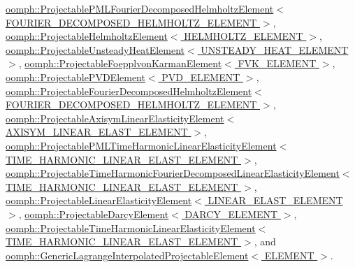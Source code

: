 \hyperlink{classoomph_1_1ProjectablePMLFourierDecomposedHelmholtzElement_a80ea03cabadebba315958b75987ab4ed}{oomph\+::\+Projectable\+P\+M\+L\+Fourier\+Decomposed\+Helmholtz\+Element$<$ F\+O\+U\+R\+I\+E\+R\+\_\+\+D\+E\+C\+O\+M\+P\+O\+S\+E\+D\+\_\+\+H\+E\+L\+M\+H\+O\+L\+T\+Z\+\_\+\+E\+L\+E\+M\+E\+N\+T $>$}, \hyperlink{classoomph_1_1ProjectableHelmholtzElement_a4ec9aaa5311ce1724014c4c4240a4d59}{oomph\+::\+Projectable\+Helmholtz\+Element$<$ H\+E\+L\+M\+H\+O\+L\+T\+Z\+\_\+\+E\+L\+E\+M\+E\+N\+T $>$}, \hyperlink{classoomph_1_1ProjectableUnsteadyHeatElement_a1fcd0a7808f65c0ffde81c1e23d0e1c1}{oomph\+::\+Projectable\+Unsteady\+Heat\+Element$<$ U\+N\+S\+T\+E\+A\+D\+Y\+\_\+\+H\+E\+A\+T\+\_\+\+E\+L\+E\+M\+E\+N\+T $>$}, \hyperlink{classoomph_1_1ProjectableFoepplvonKarmanElement_a7b6ce72f267669ecd5fc0119f669772f}{oomph\+::\+Projectable\+Foepplvon\+Karman\+Element$<$ F\+V\+K\+\_\+\+E\+L\+E\+M\+E\+N\+T $>$}, \hyperlink{classoomph_1_1ProjectablePVDElement_a82923f600601aa9f0c9e1b168f0d8fa5}{oomph\+::\+Projectable\+P\+V\+D\+Element$<$ P\+V\+D\+\_\+\+E\+L\+E\+M\+E\+N\+T $>$}, \hyperlink{classoomph_1_1ProjectableFourierDecomposedHelmholtzElement_ab1f9e43fe32a5c09fefe61f324a650cc}{oomph\+::\+Projectable\+Fourier\+Decomposed\+Helmholtz\+Element$<$ F\+O\+U\+R\+I\+E\+R\+\_\+\+D\+E\+C\+O\+M\+P\+O\+S\+E\+D\+\_\+\+H\+E\+L\+M\+H\+O\+L\+T\+Z\+\_\+\+E\+L\+E\+M\+E\+N\+T $>$}, \hyperlink{classoomph_1_1ProjectableAxisymLinearElasticityElement_a56a9ecb113858a8ab28a1125e879416d}{oomph\+::\+Projectable\+Axisym\+Linear\+Elasticity\+Element$<$ A\+X\+I\+S\+Y\+M\+\_\+\+L\+I\+N\+E\+A\+R\+\_\+\+E\+L\+A\+S\+T\+\_\+\+E\+L\+E\+M\+E\+N\+T $>$}, \hyperlink{classoomph_1_1ProjectablePMLTimeHarmonicLinearElasticityElement_abd0c7d21ef3ba99745851db30d2d1a99}{oomph\+::\+Projectable\+P\+M\+L\+Time\+Harmonic\+Linear\+Elasticity\+Element$<$ T\+I\+M\+E\+\_\+\+H\+A\+R\+M\+O\+N\+I\+C\+\_\+\+L\+I\+N\+E\+A\+R\+\_\+\+E\+L\+A\+S\+T\+\_\+\+E\+L\+E\+M\+E\+N\+T $>$}, \hyperlink{classoomph_1_1ProjectableTimeHarmonicFourierDecomposedLinearElasticityElement_a907adc47e9267b2eca42631dc95c5af4}{oomph\+::\+Projectable\+Time\+Harmonic\+Fourier\+Decomposed\+Linear\+Elasticity\+Element$<$ T\+I\+M\+E\+\_\+\+H\+A\+R\+M\+O\+N\+I\+C\+\_\+\+L\+I\+N\+E\+A\+R\+\_\+\+E\+L\+A\+S\+T\+\_\+\+E\+L\+E\+M\+E\+N\+T $>$}, \hyperlink{classoomph_1_1ProjectableLinearElasticityElement_af147f2ea0fb696ae5e32b21c7b877dfb}{oomph\+::\+Projectable\+Linear\+Elasticity\+Element$<$ L\+I\+N\+E\+A\+R\+\_\+\+E\+L\+A\+S\+T\+\_\+\+E\+L\+E\+M\+E\+N\+T $>$}, \hyperlink{classoomph_1_1ProjectableDarcyElement_a32091c680d7793baed0e5294c6143418}{oomph\+::\+Projectable\+Darcy\+Element$<$ D\+A\+R\+C\+Y\+\_\+\+E\+L\+E\+M\+E\+N\+T $>$}, \hyperlink{classoomph_1_1ProjectableTimeHarmonicLinearElasticityElement_a5d6d66a33214a0aff4e661fca8350a83}{oomph\+::\+Projectable\+Time\+Harmonic\+Linear\+Elasticity\+Element$<$ T\+I\+M\+E\+\_\+\+H\+A\+R\+M\+O\+N\+I\+C\+\_\+\+L\+I\+N\+E\+A\+R\+\_\+\+E\+L\+A\+S\+T\+\_\+\+E\+L\+E\+M\+E\+N\+T $>$}, and \hyperlink{classoomph_1_1GenericLagrangeInterpolatedProjectableElement_a43bb151ce94f5f171b5f0577e1f46909}{oomph\+::\+Generic\+Lagrange\+Interpolated\+Projectable\+Element$<$ E\+L\+E\+M\+E\+N\+T $>$}.



